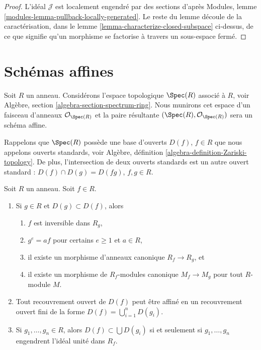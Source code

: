 \begin{proof}
L'idéal $\mathcal{J}$ est localement engendré par des sections
d'après Modules, lemme \ref{modules-lemma-pullback-locally-generated}.
Le reste du lemme découle de la caractérisation, dans le lemme
\ref{lemma-characterize-closed-subspace} ci-dessus, de ce
que signifie qu'un morphisme se factorise à travers un sous-espace
fermé.
\end{proof}














\section{Schémas affines}
\label{section-affine-schemes}

\noindent
Soit $R$ un anneau. Considérons l'espace topologique $\Spec(R)$
associé à $R$, voir Algèbre, section \ref{algebra-section-spectrum-ring}.
Nous munirons cet espace d'un faisceau d'anneaux $\mathcal{O}_{\Spec(R)}$
et la paire résultante $(\Spec(R), \mathcal{O}_{\Spec(R)})$
sera un schéma affine.

\medskip\noindent
Rappelons que $\Spec(R)$ possède une base d'ouverts $D(f)$,
$f \in R$ que nous appelons ouverts standards, voir
Algèbre, définition \ref{algebra-definition-Zariski-topology}.
De plus, l'intersection de deux ouverts standards est un autre
ouvert standard : $D(f) \cap D(g) = D(fg)$, $f, g\in R$.

\begin{lemma}
\label{lemma-standard-open}
Soit $R$ un anneau. Soit $f \in R$.
\begin{enumerate}
\item Si $g\in R$ et $D(g) \subset D(f)$, alors
\begin{enumerate}
\item $f$ est inversible dans $R_g$,
\item $g^e = af$ pour certains $e \geq 1$ et $a \in R$, \item
il existe un morphisme d'anneaux canonique $R_f \to R_g$, et
\item il existe un morphisme de $R_f$-modules canonique
$M_f \to M_g$ pour tout $R$-module $M$.
\end{enumerate}
\item Tout recouvrement ouvert de $D(f)$ peut être affiné en un
recouvrement ouvert fini de la forme $D(f) = \bigcup_{i = 1}^n D(g_i)$.
\item Si $g_1, \ldots, g_n \in R$, alors $D(f) \subset \bigcup D(g_i)$
si et seulement si $g_1, \ldots, g_n$ engendrent l'idéal unité dans $R_f$.
\end{enumerate}
\end{lemma}

